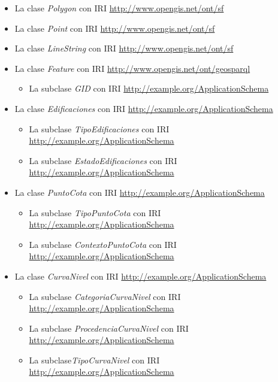 \begin{itemize}
	\item La clase \textit{Polygon} con IRI \url{http://www.opengis.net/ont/sf}
	
	\item La clase \textit{Point} con IRI \url{http://www.opengis.net/ont/sf}
	
	\item La clase \textit{LineString} con IRI  \url{http://www.opengis.net/ont/sf}
	
	\item La clase \textit{Feature} con IRI \url{http://www.opengis.net/ont/geosparql}
	
	\begin{itemize}
		\item La subclase \textit{GID} con IRI \url{http://example.org/ApplicationSchema}
	\end{itemize}
	
	
	\item La clase \textit{Edificaciones} con IRI \url{http://example.org/ApplicationSchema}
		\begin{itemize}
	\item La subclase \textit{TipoEdificaciones} con IRI \url{http://example.org/ApplicationSchema}
	\item La subclase \textit{EstadoEdificaciones} con IRI \url{http://example.org/ApplicationSchema}
		\end{itemize}
	
	\item La clase \textit{PuntoCota} con IRI \url{http://example.org/ApplicationSchema}
		\begin{itemize}
	\item La subclase \textit{TipoPuntoCota} con IRI \url{http://example.org/ApplicationSchema}
	\item La subclase \textit{ContextoPuntoCota} con IRI \url{http://example.org/ApplicationSchema}
		\end{itemize}
	
	\item La clase \textit{CurvaNivel} con IRI \url{http://example.org/ApplicationSchema}
	
	\begin{itemize}
	\item La subclase \textit{CategoriaCurvaNivel} con IRI \url{http://example.org/ApplicationSchema}
	\item La subclase \textit{ProcedenciaCurvaNivel} con IRI \url{http://example.org/ApplicationSchema}
	\item La subclase\textit{TipoCurvaNivel} con IRI \url{ http://example.org/ApplicationSchema}
	\end{itemize}
\end{itemize}

